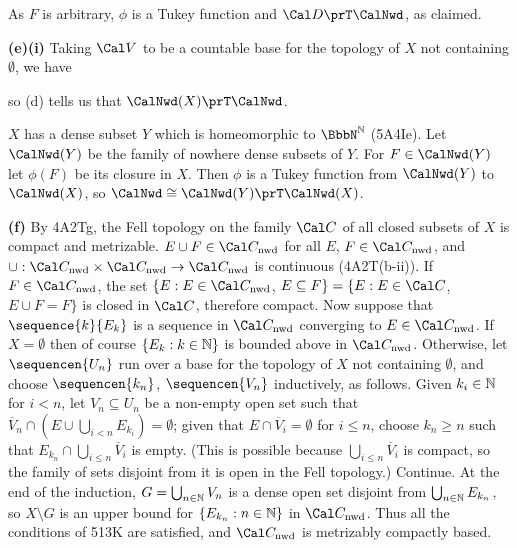 {As $F$ is arbitrary, $\phi$ is a Tukey function and $\Cal D\prT\CalNwd$,
as claimed.

\medskip

{\bf (e)(i)} Taking $\Cal V$ to be a countable base for the topology of $X$
not containing $\emptyset$, we have


\noindent so (d) tells us that $\CalNwd(X)\prT\CalNwd$.

\medskip

 $X$ has a dense subset $Y$ which is
homeomorphic to $\NN$ (5A4Ie).   Let $\CalNwd(Y)$ be the family of nowhere
dense subsets of $Y$.   For $F\in\CalNwd(Y)$ let $\phi(F)$ be its closure in
$X$.   Then $\phi$ is a Tukey function from $\CalNwd(Y)$ to $\CalNwd(X)$, so
$\CalNwd\cong\CalNwd(Y)\prT\CalNwd(X)$.

\medskip

{\bf (f)} By 4A2Tg,
the Fell topology on the family $\Cal C$ of all closed subsets of $X$
is compact and metrizable.   $E\cup F\in\Cal C_{\text{nwd}}$ for all $E$,
$F\in\Cal C_{\text{nwd}}$, and
$\cup:\Cal C_{\text{nwd}}\times\Cal C_{\text{nwd}}\to\Cal C_{\text{nwd}}$
is continuous (4A2T(b-ii)).   If $F\in\Cal C_{\text{nwd}}$, the set
$\{E:E\in\Cal C_{\text{nwd}}$, $E\subseteq F\}
=\{E:E\in\Cal C$, $E\cup F=F\}$ is closed in $\Cal C$, therefore compact.
Now suppose that $\sequence{k}{E_k}$ is a sequence in $\Cal C_{\text{nwd}}$
converging to $E\in\Cal C_{\text{nwd}}$.   If $X=\emptyset$ then of course
$\{E_k:k\in\Bbb N\}$ is bounded above in $\Cal C_{\text{nwd}}$.
Otherwise, let $\sequencen{U_n}$ run over a base for the topology of $X$
not containing $\emptyset$, and choose $\sequencen{k_n}$, $\sequencen{V_n}$
inductively, as follows.   Given $k_i\in\Bbb N$ for $i<n$, let
$V_n\subseteq U_n$ be a non-empty open set such that
$\overline{V}_n\cap(E\cup\bigcup_{i<n}E_{k_i})=\emptyset$;  given that
$E\cap\overline{V}_i=\emptyset$ for $i\le n$, choose $k_n\ge n$ such that
$E_{k_n}\cap\bigcup_{i\le n}\overline{V}_i$ is empty.   (This is possible
because $\bigcup_{i\le n}\overline{V}_i$ is compact, so the family of
sets disjoint from it is open in the Fell topology.)   Continue.   At
the end of the induction, $G=\bigcup_{n\in\Bbb N}V_n$ is a dense open set
disjoint from $\bigcup_{n\in\Bbb N}E_{k_n}$, so $X\setminus G$ is an upper
bound for $\{E_{k_n}:n\in\Bbb N\}$ in $\Cal C_{\text{nwd}}$.   Thus all the
conditions of 513K are satisfied, and $\Cal C_{\text{nwd}}$ is metrizably
compactly based.
}%

